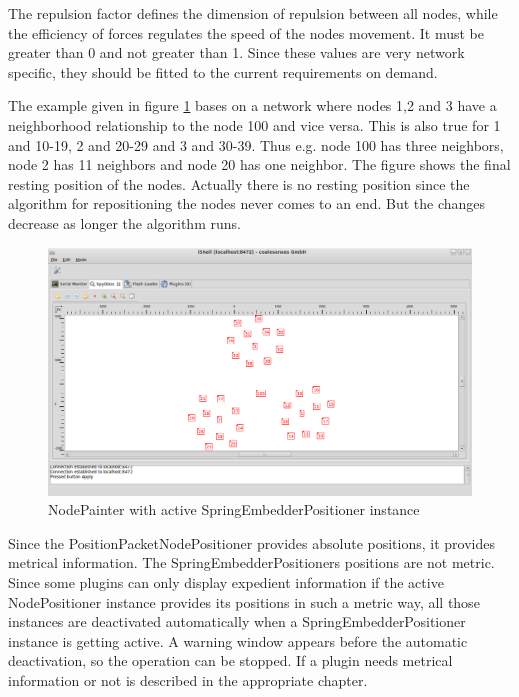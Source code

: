 The repulsion factor defines the dimension of repulsion between all nodes, while the efficiency of forces regulates
the speed of the nodes movement. It must be greater than 0 and not greater than 1. Since these values are very
network specific, they should be fitted to the current requirements on demand.

The example given in figure \ref{pic:sep} bases on a network where nodes 1,2 and 3 have a neighborhood relationship
to the node 100 and vice versa. This is also true for 1 and 10-19, 2 and 20-29 and 3 and 30-39. Thus e.g. node 100 has
three neighbors, node 2 has 11 neighbors and node 20 has one neighbor. The figure shows the final resting
position of the nodes. Actually there is no resting position since the algorithm for repositioning the nodes
never comes to an end. But the changes decrease as longer the algorithm runs.

\begin{figure}[htb]
  \begin{center}
    \includegraphics[width=13.2cm]{./pics/springembedderpositioner}
    \caption{NodePainter with active SpringEmbedderPositioner instance}
    \label{pic:sep}
  \end{center}
\end{figure}

Since the PositionPacketNodePositioner provides absolute positions, it provides metrical information.
The SpringEmbedderPositioners positions are not metric. Since some plugins
can only display expedient information if the active NodePositioner instance provides its positions
in such a metric way, all those instances are deactivated automatically when a SpringEmbedderPositioner
instance is getting active. A warning window appears before the automatic deactivation, so the operation
can be stopped. If a plugin needs metrical information or not is described in the appropriate chapter.



